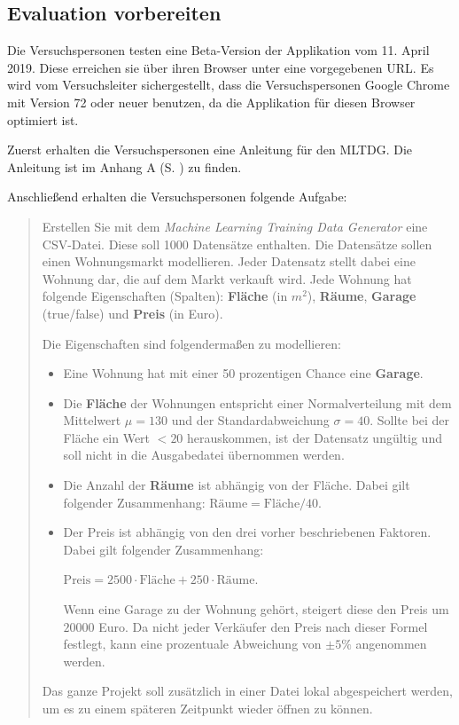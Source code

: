 \subsection{Evaluation vorbereiten}

Die Versuchspersonen testen eine Beta-Version der Applikation vom 11. April 2019. Diese erreichen sie über ihren Browser unter eine vorgegebenen URL. Es wird vom Versuchsleiter sichergestellt, dass die Versuchspersonen Google Chrome mit Version 72 oder neuer benutzen, da die Applikation für diesen Browser optimiert ist.

Zuerst erhalten die Versuchspersonen eine Anleitung für den \ac{MLTDG}. Die Anleitung ist im Anhang A (S. \pageref{apx:manual}) zu finden.

Anschließend erhalten die Versuchspersonen folgende Aufgabe:

\begin{quote}
    
    Erstellen Sie mit dem \textit{Machine Learning Training Data Generator} eine CSV-Datei. Diese soll 1000 Datensätze enthalten. Die Datensätze sollen einen Wohnungsmarkt modellieren. Jeder Datensatz stellt dabei eine Wohnung dar, die auf dem Markt verkauft wird. Jede Wohnung hat folgende Eigenschaften (Spalten): \textbf{Fläche} (in $m^2$), \textbf{Räume}, \textbf{Garage} (true/false) und \textbf{Preis} (in Euro).

    Die Eigenschaften sind folgendermaßen zu modellieren:
    \begin{itemize}
        \item Eine Wohnung hat mit einer 50 prozentigen Chance eine \textbf{Garage}.
        \item Die \textbf{Fläche} der Wohnungen entspricht einer Normalverteilung mit dem Mittelwert $\mu = 130$ und der Standardabweichung $\sigma = 40$. Sollte bei der Fläche ein Wert $< 20$ herauskommen, ist der Datensatz ungültig und soll nicht in die Ausgabedatei übernommen werden.
        \item Die Anzahl der \textbf{Räume} ist abhängig von der Fläche. Dabei gilt folgender Zusammenhang: $\textrm{Räume} = \textrm{Fläche} / 40$.
        \item Der Preis ist abhängig von den drei vorher beschriebenen Faktoren. Dabei gilt folgender Zusammenhang:
        
        $\textrm{Preis} = 2500 \cdot \textrm{Fläche} + 250 \cdot \textrm{Räume}$.
        
        Wenn eine Garage zu der Wohnung gehört, steigert diese den Preis um $20000$ Euro. Da nicht jeder Verkäufer den Preis nach dieser Formel festlegt, kann eine prozentuale Abweichung von $\pm 5\%$ angenommen werden.
    \end{itemize}

    Das ganze Projekt soll zusätzlich in einer Datei lokal abgespeichert werden, um es zu einem späteren Zeitpunkt wieder öffnen zu können.

\end{quote}

